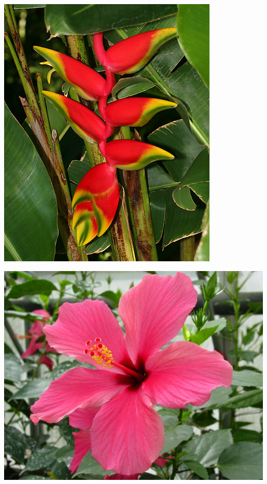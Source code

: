 \documentclass{article}
\begin{document}
\begin{center}
\includegraphics[height=0.9\textheight, angle=90]{../Heliconia_rostrata.jpg}
\end{center}
\newpage

\begin{center}
\includegraphics[height=0.9\textheight, angle=90]{../Hibiscus.jpg}
\end{center}
\newpage
\end{document}

